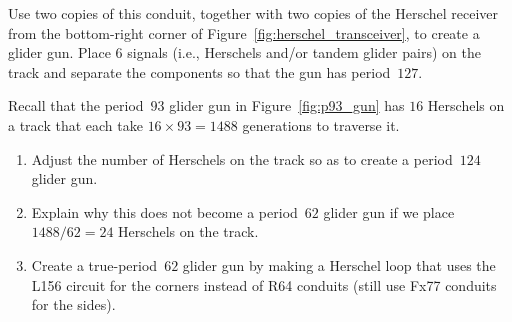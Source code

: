 \begin{multicols}{2}
\begin{problem}
	\noindent Use two copies of this conduit, together with two copies of the Herschel receiver from the bottom-right corner of Figure~\ref{fig:herschel_transceiver}, to create a glider gun. Place $6$ signals (i.e., Herschels and/or tandem glider pairs) on the track and separate the components so that the gun has period~$127$.
\end{problem}


\mfilbreak


\begin{problem}\label{exer:p62_gun_problem}
	Recall that the period~$93$ glider gun in Figure~\ref{fig:p93_gun} has $16$ Herschels on a track that each take $16 \times 93 = 1488$ generations to traverse it.\smallskip
	
	\begin{enumerate}[label=\bf\color{ocre}(\alph*)]
		\item Adjust the number of Herschels on the track so as to create a period~$124$ glider gun.
		
		\item Explain why this does not become a period~$62$ glider gun if we place $1488/62 = 24$ Herschels on the track. %
		
		\item Create a true-period~$62$ glider gun by making a Herschel loop that uses the L156 circuit for the corners instead of R64 conduits (still use Fx77 conduits for the sides).
	\end{enumerate}
\end{problem}



\end{multicols}
